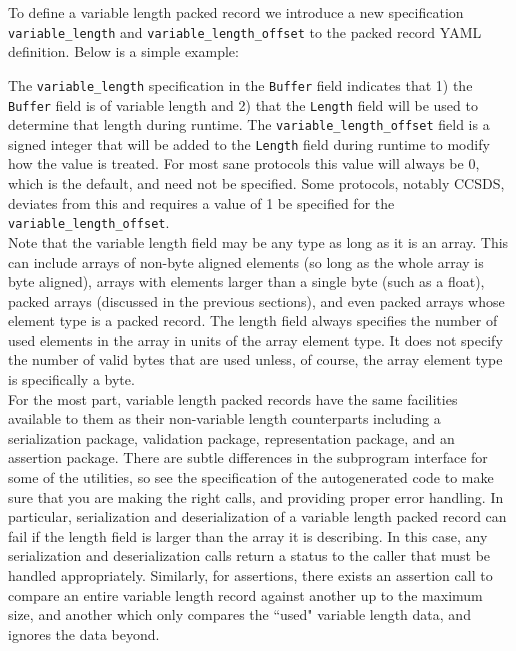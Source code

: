 To define a variable length packed record we introduce a new specification \texttt{variable\_length} and \texttt{variable\_length\_offset} to the packed record YAML definition. Below is a simple example:


The \texttt{variable\_length} specification in the \texttt{Buffer} field indicates that 1) the \texttt{Buffer} field is of variable length and 2) that the \texttt{Length} field will be used to determine that length during runtime. The \texttt{variable\_length\_offset} field is a signed integer that will be added to the \texttt{Length} field during runtime to modify how the value is treated. For most sane protocols this value will always be 0, which is the default, and need not be specified. Some protocols, notably CCSDS, deviates from this and requires a value of 1 be specified for the \texttt{variable\_length\_offset}. \\

Note that the variable length field may be any type as long as it is an array. This can include arrays of non-byte aligned elements (so long as the whole array is byte aligned), arrays with elements larger than a single byte (such as a float), packed arrays (discussed in the previous sections), and even packed arrays whose element type is a packed record. The length field always specifies the number of used elements in the array in units of the array element type. It does not specify the number of valid bytes that are used unless, of course, the array element type is specifically a byte. \\

For the most part, variable length packed records have the same facilities available to them as their non-variable length counterparts including a serialization package, validation package, representation package, and an assertion package. There are subtle differences in the subprogram interface for some of the utilities, so see the specification of the autogenerated code to make sure that you are making the right calls, and providing proper error handling. In particular, serialization and deserialization of a variable length packed record can fail if the length field is larger than the array it is describing. In this case, any serialization and deserialization calls return a status to the caller that must be handled appropriately. Similarly, for assertions, there exists an assertion call to compare an entire variable length record against another up to the maximum size, and another which only compares the ``used" variable length data, and ignores the data beyond.

